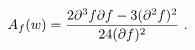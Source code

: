 \begin{equation}\label{2.10}
A_f(w)={2\partial^3f \partial f -3 (\partial ^2f)^2
\over 24(\partial f)^2}~.
\end{equation}

